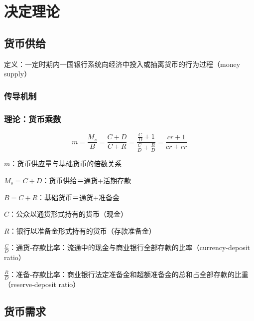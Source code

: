 \documentclass[12pt]{book}
\begin{document}
\section{决定理论}



\subsection{货币供给}



定义：一定时期内一国银行系统向经济中投入或抽离货币的行为过程（money supply）




\subsubsection{传导机制}





\subsubsection{理论：货币乘数}


\begin{equation*}
    m=\frac{M_s}{B}=\frac{C+D}{C+R}=\frac{\frac{C}{D}+1}{\frac{C}{D}+\frac{R}{D}}=\frac{cr+1}{cr+rr}
\end{equation*}
\par $m$：货币供应量与基础货币的倍数关系
\par $M_s=C+D$：货币供给＝通货+活期存款
\par $B=C+R$：基础货币＝通货+准备金
\par $C$：公众以通货形式持有的货币（现金）
\par $R$：银行以准备金形式持有的货币（存款准备金）
\par $\frac{C}{D}$：通货-存款比率：流通中的现金与商业银行全部存款的比率（currency-deposit ratio）
\par $\frac{R}{D}$：准备-存款比率：商业银行法定准备金和超额准备金的总和占全部存款的比重（reserve-deposit ratio）
  













\subsection{货币需求}
\end{document}
